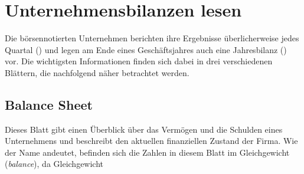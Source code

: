 

\chapter{Unternehmensbilanzen lesen}

Die börsennotierten Unternehmen berichten ihre Ergebnisse überlicherweise jedes Quartal  () und legen am Ende eines Geschäftsjahres auch eine Jahresbilanz () vor.
Die wichtigsten Informationen finden sich dabei in drei verschiedenen Blättern, die nachfolgend näher betrachtet werden.

\section{Balance Sheet}
Dieses Blatt gibt einen Überblick über das Vermögen und die Schulden eines Unternehmens und beschreibt den aktuellen finanziellen Zustand der Firma.
Wie der Name andeutet, befinden sich die Zahlen in diesem Blatt im Gleichgewicht (\textit{balance}), da Gleichgewicht

